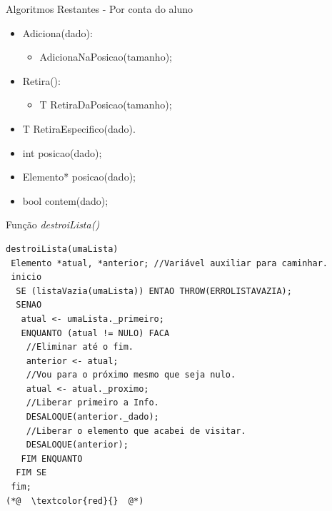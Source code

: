 \documentclass[12pt,table,xcolor={dvipsnames}]{beamer}
\begin{document}
\begin{frame}[fragile]{Algoritmos Restantes - Por conta do aluno}
\begin{itemize}
\item Adiciona(dado):
\begin{itemize}
\item AdicionaNaPosicao(tamanho);
\end{itemize}
\item Retira():
\begin{itemize}
\item T RetiraDaPosicao(tamanho);
\end{itemize}
\item T RetiraEspecifico(dado).
\item int posicao(dado);
\item Elemento* posicao(dado);
\item bool contem(dado);
\end{itemize}
\end{frame}

\begin{frame}[fragile]{Função \textit{destroiLista()}}
\begin{lstlisting}
destroiLista(umaLista)
 Elemento *atual, *anterior; //Variável auxiliar para caminhar.
 inicio
  SE (listaVazia(umaLista)) ENTAO THROW(ERROLISTAVAZIA);
  SENAO
   atual <- umaLista._primeiro;    
   ENQUANTO (atual != NULO) FACA 
    //Eliminar até o fim.
    anterior <- atual;
    //Vou para o próximo mesmo que seja nulo.
    atual <- atual._proximo;
    //Liberar primeiro a Info.
    DESALOQUE(anterior._dado);
    //Liberar o elemento que acabei de visitar.
    DESALOQUE(anterior);
   FIM ENQUANTO
  FIM SE
 fim;
(*@  \textcolor{red}{}  @*)
\end{lstlisting}
\end{frame}
\end{document}
